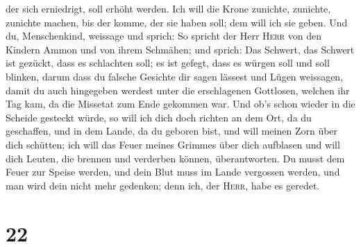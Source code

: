 der sich erniedrigt, soll erhöht werden.  Ich will die
Krone zunichte, zunichte, zunichte machen, bis der komme, der sie haben
soll; dem will ich sie geben.  Und du, Menschenkind,
weissage und sprich: So spricht der Herr \textsc{Herr} von den Kindern
Ammon und von ihrem Schmähen; und sprich: Das Schwert, das Schwert ist
gezückt, dass es schlachten soll; es ist gefegt, dass es würgen soll und
soll blinken,  darum dass du falsche Gesichte dir sagen
lässest und Lügen weissagen, damit du auch hingegeben werdest unter die
erschlagenen Gottlosen, welchen ihr Tag kam, da die Missetat zum Ende
gekommen war.  Und ob's schon wieder in die Scheide
gesteckt würde, so will ich dich doch richten an dem Ort, da du
geschaffen, und in dem Lande, da du geboren bist,  und
will meinen Zorn über dich schütten; ich will das Feuer meines Grimmes
über dich aufblasen und will dich Leuten, die brennen und verderben
können, überantworten.  Du musst dem Feuer zur Speise
werden, und dein Blut muss im Lande vergossen werden, und man wird dein
nicht mehr gedenken; denn ich, der \textsc{Herr}, habe es geredet.

\hypertarget{section-21}{%
\section{22}\label{section-21}}

